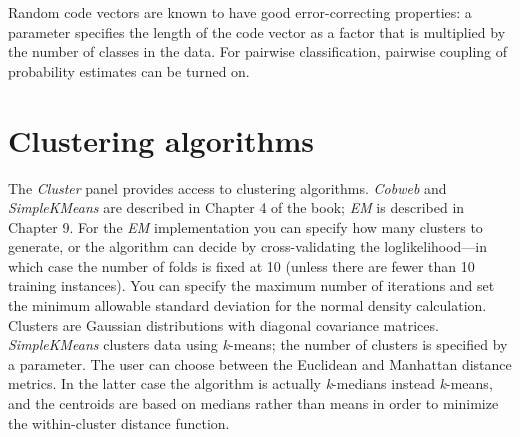 Random code vectors are known to have good error-correcting
properties: a parameter specifies the length of the code vector as a
factor that is multiplied by the number of classes in the data. For
pairwise classification, pairwise coupling of probability estimates
can be turned on.

\section{Clustering algorithms}

The {\em Cluster} panel provides access to clustering
algorithms. \textit{Cobweb} and \textit{SimpleKMeans} are described in
Chapter 4 of the book; \textit{EM} is described in Chapter 9. For the
\textit{EM} implementation you can specify how many clusters to
generate, or the algorithm can decide by cross-validating the loglikelihood---in which
case the number of folds is fixed at 10 (unless there are fewer than
10 training instances). You can specify the maximum number of
iterations and set the minimum allowable standard deviation for the
normal density calculation. Clusters are Gaussian distributions with
diagonal covariance matrices. \textit{SimpleKMeans} clusters data
using \textit{k}-means; the number of clusters is specified by a
parameter. The user can choose between the Euclidean and Manhattan
distance metrics. In the latter case the algorithm is actually
\textit{k}-medians instead \textit{k}-means, and the centroids are
based on medians rather than means in order to minimize the
within-cluster distance function.

